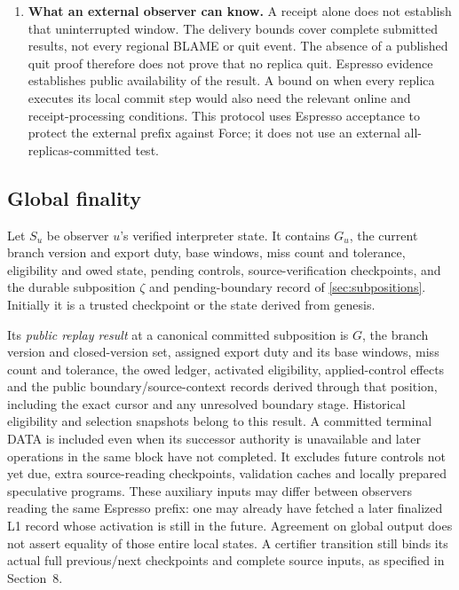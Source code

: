 \documentclass[11pt,a4paper]{article}
\newcommand{\defterm}[1]{\textcolor{rrBlue}{\textit{#1}}}
\newcounter{protocol}
\begin{document}
\begin{enumerate}[label=(\arabic*),itemsep=4pt]
\item \textbf{What an external observer can know.} A receipt alone
does not establish that uninterrupted window. The delivery bounds cover
complete submitted results, not every regional BLAME or quit event. The
absence of a published quit proof therefore does not prove that no replica
quit. Espresso evidence establishes public availability of the result.
A bound on when every replica executes its local commit step would also
need the relevant online and receipt-processing conditions. This protocol
uses Espresso acceptance to protect the external prefix against Force;
it does not use an external all-replicas-committed test.
\end{enumerate}





\subsection{Global finality}
\label{sec:global-finality}
Let $S_u$ be observer $u$'s verified interpreter state. It contains $G_u$,
the current branch version and export duty, base windows, miss count and tolerance, eligibility and owed
state, pending controls, source-verification checkpoints, and the durable
subposition $\zeta$ and pending-boundary record of \cref{sec:subpositions}.
Initially it is a trusted checkpoint or the state derived from genesis.

Its \defterm{public replay result} at a canonical committed subposition is
$G$, the branch version and closed-version set, assigned export duty and
its base windows, miss count and tolerance, the owed ledger,
activated eligibility, applied-control effects and the
public boundary/source-context records derived through that position,
including the exact cursor and any unresolved boundary stage. Historical
eligibility and selection snapshots belong to this result. A committed
terminal DATA is included even when its successor authority is unavailable
and later operations in the same block have not completed.
It excludes future controls not yet due, extra source-reading checkpoints,
validation caches and locally prepared speculative programs.
These auxiliary inputs may differ between observers reading the same
Espresso prefix: one may already have fetched a later finalized L1 record
whose activation is still in the future. Agreement on global output
does not assert equality of those entire local states.
A certifier transition still binds its actual full previous/next
checkpoints and complete source inputs, as specified in Section~8.
\end{document}

